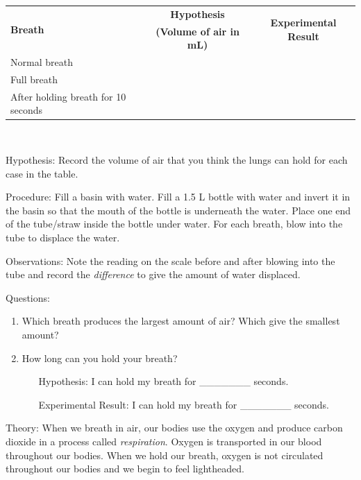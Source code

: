\begin{description*}
{\begin{tabular}{|l|c|c|} \hline
\multirow{2}{*}{\textbf{Breath}} & \textbf{Hypothesis} & \multirow{2}{*}{\textbf{Experimental Result}} \\
& \textbf{(Volume of air in mL)} & \\ \hline
Normal breath & & \\ \hline
Full breath & & \\ \hline
After holding breath for 10 seconds & & \\ \hline
\end{tabular} \\[10pt]
}
\item[Hypothesis:]{Record the volume of air that you think the lungs can hold for each case in the table.}
\item[Procedure:]{Fill a basin with water. Fill a 1.5 L bottle with water and invert it in the basin so that the mouth of the bottle is underneath the water. Place one end of the tube/straw inside the bottle under water. For each breath, blow into the tube to displace the water.}
\item[Observations:]{Note the reading on the scale before and after blowing into the tube and record the \emph{difference} to give the amount of water displaced.}
\item[Questions:]{}\hfill
\begin{enumerate}
\item Which breath produces the largest amount of air? Which give the smallest amount?
\item How long can you hold your breath?
	\begin{enumerate}
	\item[] Hypothesis: I can hold my breath for \_\_\_\_\_\_\_ seconds.
	\item[] Experimental Result: I can hold my breath for \_\_\_\_\_\_\_ seconds.
	\end{enumerate}
\end{enumerate}
\item[Theory:]{When we breath in air, our bodies use the oxygen and produce carbon dioxide in a process called \emph{respiration}. Oxygen is transported in our blood throughout our bodies. When we hold our breath, oxygen is not circulated throughout our bodies and we begin to feel lightheaded.}
\end{description*}

\pagebreak



